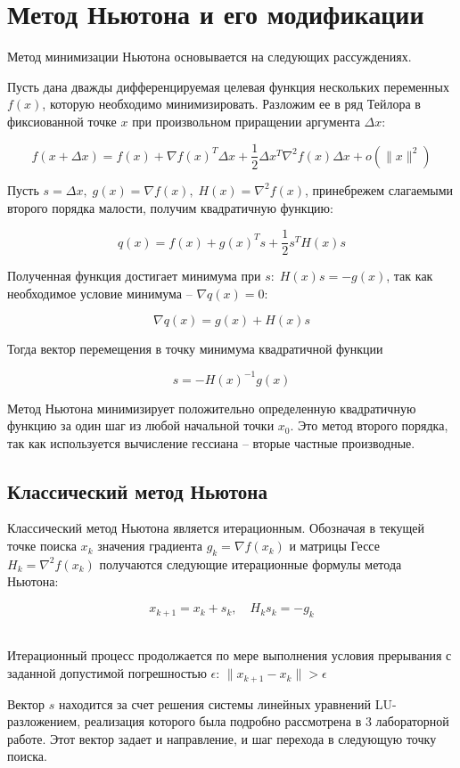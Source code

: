 \documentclass[12pt]{article}
\begin{document}
\newpage
\section{Метод Ньютона и его модификации}

Метод минимизации Ньютона основывается на следующих рассуждениях.

Пусть дана дважды дифференцируемая целевая функция нескольких переменных $f(x)$, которую необходимо минимизировать. Разложим ее в ряд Тейлора в фиксиованной точке $x$ при произвольном приращении аргумента $\Delta x$:

\[ f(x+\Delta x) = f(x) + \nabla f(x)^T \Delta x + \frac{1}{2} \Delta x^T \nabla^2f(x)\Delta x + o(\lVert x \rVert ^ 2) \]

Пусть $s = \Delta x, \; g(x) = \nabla f(x), \; H(x) = \nabla^2 f(x)$, принебрежем слагаемыми второго порядка малости, получим квадратичную функцию:

\[ q(x) = f(x) + g(x)^Ts + \frac{1}{2} s^T H(x)s \]

Полученная функция достигает минимума при $s: \; H(x)s = -g(x)$, так как необходимое условие минимума -- $\nabla q(x) = 0$:

\[ \nabla q(x) = g(x)+H(x)s \] 

Тогда вектор перемещения в точку минимума квадратичной функции

\[ s = -H(x)^{-1} g(x) \]

Метод Ньютона минимизирует положительно определенную квадратичную функцию за один шаг из любой начальной точки $x_0$. Это метод второго порядка, так как используется вычисление гессиана -- вторые частные производные.

\subsection{Классический метод Ньютона}

Классический метод Ньютона является итерационным. Обозначая в текущей точке поиска $x_k$ значения градиента $g_k = \nabla f(x_k)$ и матрицы Гессе $H_k = \nabla^2 f(x_k)$ получаются следующие итерационные формулы метода Ньютона:

\[ x_{k+1}=x_k+s_k, \quad H_k s_k = -g_k \]\

Итерационный процесс продолжается по мере выполнения условия прерывания с заданной допустимой погрешностью $\epsilon$: $\lVert x_{k+1} - x_k \rVert > \epsilon$

Вектор $s$ находится за счет решения системы линейных уравнений LU-разложением, реализация которого была подробно рассмотрена в 3 лабораторной работе. Этот вектор задает и направление, и шаг перехода в следующую точку поиска.
\end{document}
